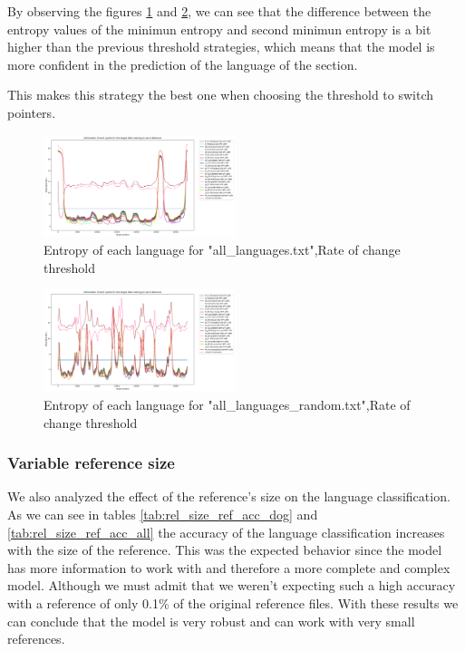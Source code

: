 \documentclass{article}
\begin{document}
By observing the figures \ref{fig:all_languages_t_c} and \ref{fig:all_languages_random_t_c}, we can see that the difference between the entropy values of the minimun entropy
and second minimun entropy is a bit higher than the previous threshold strategies, which means that the model is more confident in the prediction of the language of the section.

This makes this strategy the best one when choosing the threshold to switch pointers.

\begin{figure}
    \centering
    \includegraphics[width=0.5\textwidth]{../results/all_languages/-t_c:0.01.png}
    \caption{Entropy of each language for "all_languages.txt",Rate of change threshold}
    \label{fig:all_languages_t_c}
\end{figure}

\begin{figure}
    \centering
    \includegraphics[width=0.5\textwidth]{../results/all_languages_random/-t_c:0.01.png}
    \caption{Entropy of each language for "all_languages_random.txt",Rate of change threshold}
    \label{fig:all_languages_random_t_c}
\end{figure}

\subsubsection{Variable reference size}
\label{subsubsec:results_locate_lang_variable_reference_size}

We also analyzed the effect of the reference's size on the language classification.
As we can see in tables \ref{tab:rel_size_ref_acc_dog} and \ref{tab:rel_size_ref_acc_all} the accuracy of the language classification increases with the size of the reference.
This was the expected behavior since the model has more information to work with and therefore a more complete and complex model.
Although we must admit that we weren't expecting such a high accuracy with a reference of only 0.1\% of the original reference files.
With these results we can conclude that the model is very robust and can work with very small references.
\end{document}
